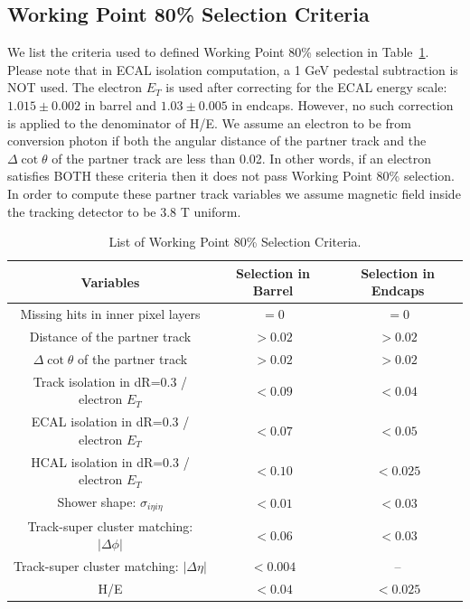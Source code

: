 \subsection{Working Point 80\% Selection Criteria}
We list the criteria used to defined Working Point 80\% selection in 
Table~\ref{tab:WP80cuts}. Please note that in ECAL isolation computation, 
a 1 GeV pedestal subtraction is NOT used. 
The electron $E_T$ is used after correcting for 
the ECAL energy scale: $1.015 \pm 0.002$ in barrel and $1.03 \pm 0.005$ in endcaps. 
However, no such correction is applied to the denominator of H/E.
We assume an electron to be from conversion photon if both 
the angular distance of the partner track and the $\Delta{\cot\theta}$ of the 
partner track are less than 0.02. 
In other words, if an electron satisfies BOTH these criteria then it does not pass 
Working Point 80\% selection.
In order to compute these partner track variables we assume magnetic field 
inside the tracking detector to be 3.8 T uniform.
\begin{table}[!ht]
\begin{center}
\begin{tabular}{c|c|c} \hline \hline
 Variables   &  Selection in Barrel  & Selection in Endcaps  \\ \hline
Missing hits in inner pixel layers          &   $=0$      &  $=0$           \\ \hline
Distance of the partner track               &  $>0.02$    &   $> 0.02$      \\ \hline
$\Delta{\cot\theta}$ of the partner track   &  $>0.02$    &   $> 0.02$      \\ \hline
Track isolation in dR=0.3 / electron $E_T$  &  $<0.09$    &   $< 0.04$         \\ \hline
ECAL isolation in dR=0.3 / electron $E_T$   &  $<0.07$    &   $< 0.05$         \\ \hline
HCAL isolation in dR=0.3 / electron $E_T$   &  $<0.10$    &   $< 0.025$           \\ \hline
Shower shape: $\sigma_{i\eta i\eta}$        & $<0.01$     &  $<0.03$     \\ \hline
Track-super cluster matching: $|\Delta\phi|$ &  $<0.06$    &   $< 0.03$         \\ \hline
Track-super cluster matching: $|\Delta\eta|$ &  $<0.004$   &    --          \\ \hline
H/E                &  $<0.04$    &   $< 0.025$          \\ \hline 
\end{tabular}
\caption{List of Working Point 80\% Selection Criteria. 
\label{tab:WP80cuts}}
\end{center}
\end{table}
